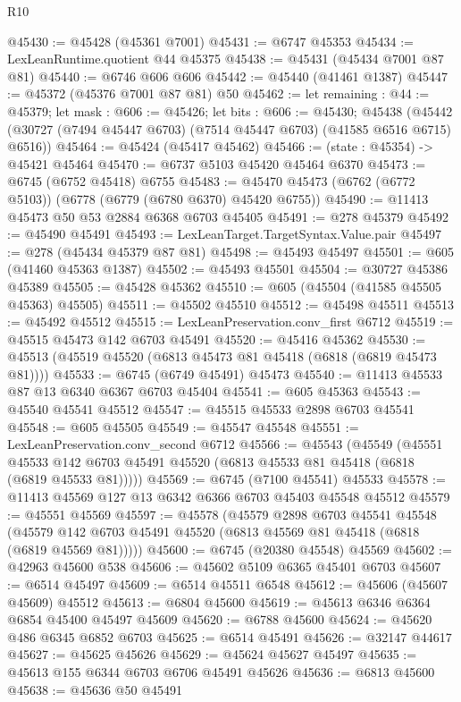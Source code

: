 \begin{lexlean}{R10}
\begin{coremodule}
@45430 := @45428 (@45361 @7001)
@45431 := @6747 @45353
@45434 := LexLeanRuntime.quotient @44 @45375
@45438 := @45431 (@45434 @7001 @87 @81)
@45440 := @6746 @606 @606
@45442 := @45440 (@41461 @1387)
@45447 := @45372 (@45376 @7001 @87 @81) @50
@45462 := let remaining : @44 := @45379;
  let mask : @606 := @45426;
  let bits : @606 := @45430;
  @45438 (@45442 (@30727 (@7494 @45447 @6703) (@7514 @45447 @6703) (@41585 @6516 @6715) @6516))
@45464 := @45424 (@45417 @45462)
@45466 := (state : @45354) -> @45421 @45464
@45470 := @6737 @5103 @45420 @45464 @6370
@45473 := @6745 (@6752 @45418) @6755
@45483 := @45470 @45473 (@6762 (@6772 @5103)) (@6778 (@6779 (@6780 @6370) @45420 @6755))
@45490 := @11413 @45473 @50 @53 @2884 @6368 @6703 @45405
@45491 := @278 @45379
@45492 := @45490 @45491
@45493 := LexLeanTarget.TargetSyntax.Value.pair
@45497 := @278 (@45434 @45379 @87 @81)
@45498 := @45493 @45497
@45501 := @605 (@41460 @45363 @1387)
@45502 := @45493 @45501
@45504 := @30727 @45386 @45389
@45505 := @45428 @45362
@45510 := @605 (@45504 (@41585 @45505 @45363) @45505)
@45511 := @45502 @45510
@45512 := @45498 @45511
@45513 := @45492 @45512
@45515 := LexLeanPreservation.conv_first @6712
@45519 := @45515 @45473 @142 @6703 @45491
@45520 := @45416 @45362
@45530 := @45513 (@45519 @45520 (@6813 @45473 @81 @45418 (@6818 (@6819 @45473 @81))))
@45533 := @6745 (@6749 @45491) @45473
@45540 := @11413 @45533 @87 @13 @6340 @6367 @6703 @45404
@45541 := @605 @45363
@45543 := @45540 @45541 @45512
@45547 := @45515 @45533 @2898 @6703 @45541
@45548 := @605 @45505
@45549 := @45547 @45548
@45551 := LexLeanPreservation.conv_second @6712
@45566 := @45543
    (@45549
      (@45551 @45533 @142 @6703 @45491 @45520 (@6813 @45533 @81 @45418 (@6818 (@6819 @45533 @81)))))
@45569 := @6745 (@7100 @45541) @45533
@45578 := @11413 @45569 @127 @13 @6342 @6366 @6703 @45403 @45548 @45512
@45579 := @45551 @45569
@45597 := @45578
    (@45579
      @2898
      @6703
      @45541
      @45548
      (@45579 @142 @6703 @45491 @45520 (@6813 @45569 @81 @45418 (@6818 (@6819 @45569 @81)))))
@45600 := @6745 (@20380 @45548) @45569
@45602 := @42963 @45600 @538
@45606 := @45602 @5109 @6365 @45401 @6703
@45607 := @6514 @45497
@45609 := @6514 @45511 @6548
@45612 := @45606 (@45607 @45609) @45512
@45613 := @6804 @45600
@45619 := @45613 @6346 @6364 @6854 @45400 @45497 @45609
@45620 := @6788 @45600
@45624 := @45620 @486 @6345 @6852 @6703
@45625 := @6514 @45491
@45626 := @32147 @44617
@45627 := @45625 @45626
@45629 := @45624 @45627 @45497
@45635 := @45613 @155 @6344 @6703 @6706 @45491 @45626
@45636 := @6813 @45600
@45638 := @45636 @50 @45491

\end{coremodule}
\end{lexlean}
